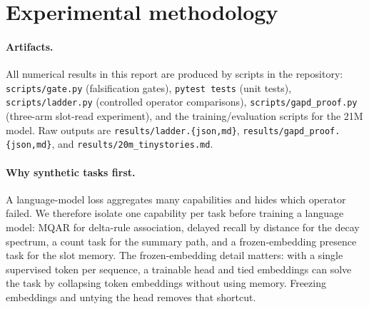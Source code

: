 \section{Experimental methodology}
\label{sec:experiments}

\paragraph{Artifacts.}
All numerical results in this report are produced by scripts in the repository:
\texttt{scripts/gate.py} (falsification gates), \texttt{pytest tests} (unit tests),
\texttt{scripts/ladder.py} (controlled operator comparisons), \texttt{scripts/gapd\_proof.py}
(three-arm slot-read experiment), and the training/evaluation scripts for the 21M model.
Raw outputs are \texttt{results/ladder.\{json,md\}},
\texttt{results/gapd\_proof.\{json,md\}}, and \texttt{results/20m\_tinystories.md}.

\paragraph{Why synthetic tasks first.}
A language-model loss aggregates many capabilities and hides which operator failed. We
therefore isolate one capability per task before training a language model:
MQAR for delta-rule association, delayed recall by distance for the decay spectrum, a count
task for the summary path, and a frozen-embedding presence task for the slot memory. The
frozen-embedding detail matters: with a single supervised token per sequence, a trainable head
and tied embeddings can solve the task by collapsing token embeddings without using memory.
Freezing embeddings and untying the head removes that shortcut.

